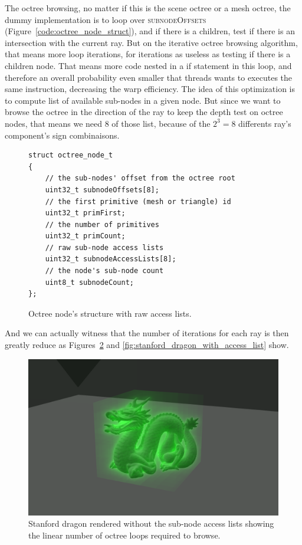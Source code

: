 The octree browsing, no matter if this is the scene octree or a mesh octree,
the dummy implementation is to loop over \textsc{subnodeOffsets}
(Figure~\ref{code:octree_node_struct}), and if there is a children, test if
there is an intersection with the current ray. But on the iterative octree
browsing algorithm, that means more loop iterations, for iterations as useless
as testing if there is a children node. That means more code nested in a if
statement in this loop, and therefore an overall probability even smaller that
threads wants to executes the same instruction, decreasing the warp efficiency.
The idea of this optimization is to compute list of available sub-nodes in
a given node. But since we want to browse the octree in the direction of the
ray to keep the depth test on octree nodes, that means we need 8 of those list,
because of the $2^3 = 8$ differents ray's component's sign combinaisons.

\begin{figure}[H]
    \centering
    \begin{lstlisting}[morekeywords={uint8_t,uint32_t}]
struct octree_node_t
{
    // the sub-nodes' offset from the octree root
    uint32_t subnodeOffsets[8];
    // the first primitive (mesh or triangle) id
    uint32_t primFirst;
    // the number of primitives
    uint32_t primCount;
    // raw sub-node access lists
    uint32_t subnodeAccessLists[8];
    // the node's sub-node count
    uint8_t subnodeCount;
};
    \end{lstlisting}
    \caption{Octree node's structure with raw access lists.}
    \label{code:raw_access_list}
\end{figure}

And we can actually witness that the number of iterations for each ray is
then greatly reduce as Figures~\ref{fig:stanford_dragon_without_access_list} and
\ref{fig:stanford_dragon_with_access_list} show.

\begin{figure}[h]
    \centering
    \includegraphics[width=0.8\columnwidth]{stats_octree_loops.png}
    \caption{
        Stanford dragon rendered without the sub-node access lists showing
        the linear number of octree loops required to browse.
    }
    \label{fig:stanford_dragon_without_access_list}
\end{figure}

